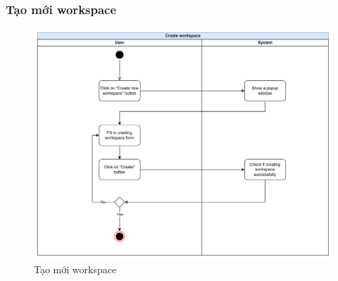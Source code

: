 \subsubsection{Tạo mới workspace}
    \begin{figure}[H]
        \centering
        \includegraphics[width=\linewidth]{Content/Phân tích và thiết kế hệ thống/documents/Sơ đồ hoạt động/images/createWorkspace.png}
        \vspace{0.5cm}
        \caption{Tạo mới workspace}
        \label{fig:Tạo mới workspace}
    \end{figure}